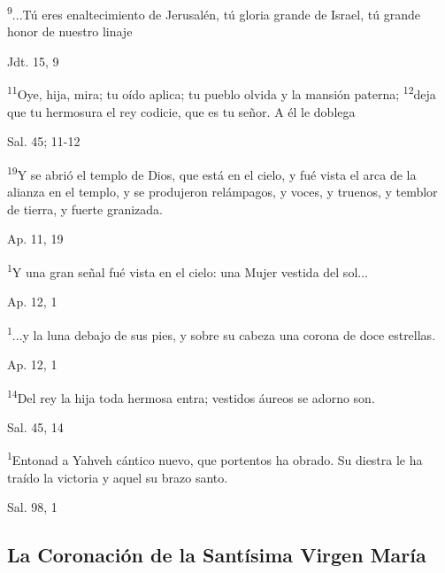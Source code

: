 \documentclass[a4paper,11pt]{article}
\begin{document}
      \textsuperscript{9}...Tú eres enaltecimiento de Jerusalén, tú gloria grande de Israel, tú grande honor de nuestro linaje
      \begin{flushright}
        Jdt. 15, 9
      \end{flushright}

      \textsuperscript{11}Oye, hija, mira; tu oído aplica; tu pueblo olvida y la mansión paterna; \textsuperscript{12}deja que tu hermosura
      el rey codicie, que es tu señor. A él le doblega
      \begin{flushright}
        Sal. 45; 11-12
      \end{flushright}

      \textsuperscript{19}Y se abrió el templo de Dios, que está en el cielo, y fué vista el arca de la alianza en el templo,
      y se produjeron relámpagos, y voces, y truenos, y temblor de tierra, y fuerte granizada.
      \begin{flushright}
        Ap. 11, 19
      \end{flushright}

      \textsuperscript{1}Y una gran señal fué vista en el cielo: una Mujer vestida del sol...
      \begin{flushright}
        Ap. 12, 1
      \end{flushright}

      \textsuperscript{1}...y la luna debajo de sus pies, y sobre su cabeza una corona de doce estrellas.
      \begin{flushright}
        Ap. 12, 1
      \end{flushright}

      \textsuperscript{14}Del rey la hija toda hermosa entra; vestidos áureos se adorno son.
      \begin{flushright}
        Sal. 45, 14
      \end{flushright}

      \textsuperscript{1}Entonad a Yahveh cántico nuevo, que portentos ha obrado. Su diestra le ha traído la victoria y aquel su brazo santo.
      \begin{flushright}
        Sal. 98, 1
      \end{flushright}
    \subsection*{\hfil La Coronación de la Santísima Virgen María \hfil}
\end{document}
